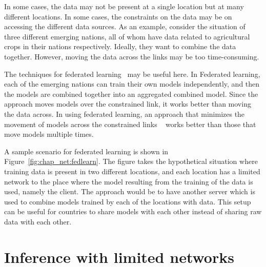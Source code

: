 In some cases, the data may not be present at a single location but at many different locations. In some cases, the constraints on the data may be on accessing the different data sources. As an example, consider the situation of three different emerging nations, all of whom have data related to agricultural crops in their nations respectively. Ideally, they want to combine the data together. However, moving the data across the links may be too time-consuming. 

The techniques for federated learning~\cite{verma2021federated}
may be useful here. In Federated learning, each of the emerging nations can train their own models independently, and then the models are combined together into an aggregated combined model. Since the approach moves models over the constrained link, it works better than moving the data across. In using federated learning, an approach that minimizes the movement of models across the constrained links ~\cite{verma2022non} works better than those that move models multiple times. 

A sample scenario for federated learning is shown in Figure~\ref{fig:chap_net:fedlearn}. The figure takes the hypothetical situation where training data is present in two different locations, and each location has a limited network to the place where the model resulting from the training of the data is used, namely the client. The approach would be to have another server which is used to combine models trained by each of the locations with data. This setup can be useful for countries to share models with each other instead of sharing raw data with each other. 


\section{Inference with limited networks}
\label{sec:limited_network:inference}





